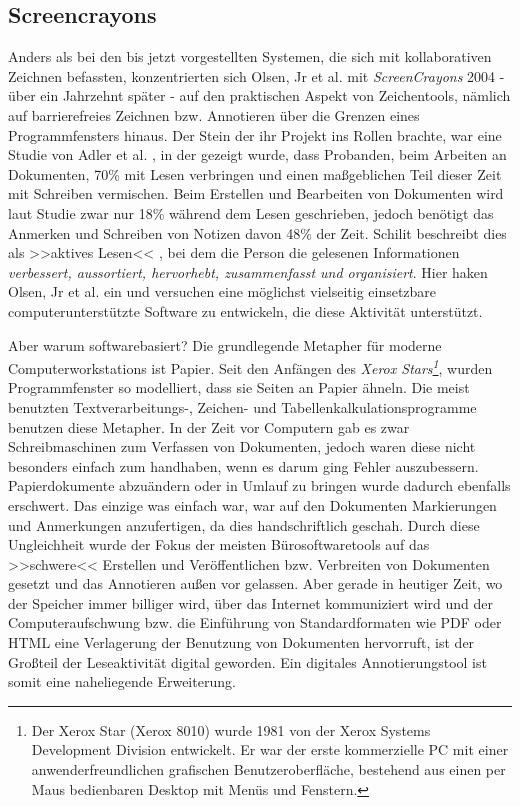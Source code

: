 \subsection{Screencrayons} 
Anders als bei den bis jetzt vorgestellten Systemen, die sich mit kollaborativen Zeichnen befassten, konzentrierten sich Olsen, Jr et al. mit \emph{ScreenCrayons} 2004 - über ein Jahrzehnt später - auf den praktischen Aspekt von Zeichentools, nämlich auf barrierefreies Zeichnen bzw. Annotieren über die Grenzen eines Programmfensters hinaus.
Der Stein der ihr Projekt ins Rollen brachte, war eine Studie von Adler et al. \citep{Adler:1998}, in der gezeigt wurde, dass Probanden, beim Arbeiten an Dokumenten, 70\% mit Lesen verbringen und einen maßgeblichen Teil dieser Zeit mit Schreiben vermischen. Beim Erstellen und Bearbeiten von Dokumenten wird laut Studie zwar nur 18\% während dem Lesen geschrieben, jedoch benötigt das Anmerken und Schreiben von Notizen davon 48\% der Zeit. Schilit beschreibt dies als >>aktives Lesen<< \citep{Schilit:1998}, bei dem die Person die gelesenen Informationen \emph{verbessert, aussortiert, hervorhebt, zusammenfasst und organisiert}. Hier haken Olsen, Jr et al. \citep{Olsen:2004} ein und versuchen eine möglichst vielseitig einsetzbare computerunterstützte Software zu entwickeln, die diese Aktivität unterstützt.

\medskip Aber warum softwarebasiert? Die grundlegende Metapher für moderne Computerworkstations ist Papier. Seit den Anfängen des \emph{Xerox Stars\footnote{Der Xerox Star (Xerox 8010) wurde 1981 von der Xerox Systems Development Division entwickelt. Er war der erste kommerzielle PC mit einer anwenderfreundlichen grafischen Benutzeroberfläche, bestehend aus einen per Maus bedienbaren Desktop mit Menüs und Fenstern.}}, wurden Programmfenster so modelliert, dass sie Seiten an Papier ähneln. Die meist benutzten Textverarbeitungs-, Zeichen- und Tabellenkalkulationsprogramme benutzen diese Metapher. 
In der Zeit vor Computern gab es zwar Schreibmaschinen zum Verfassen von Dokumenten, jedoch waren diese nicht besonders einfach zum handhaben, wenn es darum ging Fehler auszubessern. Papierdokumente abzuändern oder in Umlauf zu bringen wurde dadurch ebenfalls erschwert. Das einzige was einfach war, war auf den Dokumenten Markierungen und Anmerkungen anzufertigen, da dies handschriftlich geschah.
Durch diese Ungleichheit wurde der Fokus der meisten Bürosoftwaretools auf das >>schwere<< Erstellen und Veröffentlichen bzw. Verbreiten von Dokumenten gesetzt und das Annotieren außen vor gelassen. Aber gerade in heutiger Zeit, wo der Speicher immer billiger wird, über das Internet kommuniziert wird und der Computeraufschwung bzw. die Einführung von Standardformaten wie \ac{PDF} oder \ac{HTML} eine Verlagerung der Benutzung von Dokumenten hervorruft, ist der Großteil der Leseaktivität digital geworden. Ein digitales Annotierungstool ist somit eine naheliegende Erweiterung.

